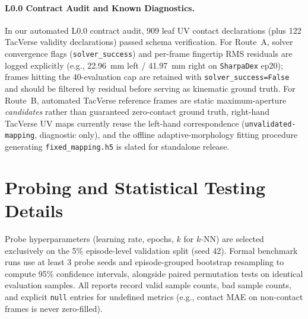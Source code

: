 \paragraph{L0.0 Contract Audit and Known Diagnostics.}
In our automated L0.0 contract audit, 909 leaf UV contact declarations (plus 122 TacVerse validity declarations) passed schema verification.
For Route~A, solver convergence flags (\texttt{solver\_success}) and per-frame fingertip RMS residuals are logged explicitly (e.g., 22.96~mm left / 41.97~mm right on \texttt{SharpaDex} ep20); frames hitting the 40-evaluation cap are retained with \texttt{solver\_success=False} and should be filtered by residual before serving as kinematic ground truth.
For Route~B, automated TacVerse reference frames are static maximum-aperture \emph{candidates} rather than guaranteed zero-contact ground truth, right-hand TacVerse UV maps currently reuse the left-hand correspondence (\texttt{unvalidated-mapping}, diagnostic only), and the offline adaptive-morphology fitting procedure generating \texttt{fixed\_mapping.h5} is slated for standalone release.

\section{Probing and Statistical Testing Details}
\label{app:probes}
Probe hyperparameters (learning rate, epochs, $k$ for $k$-NN) are selected exclusively on the 5\% episode-level validation split (seed 42).
Formal benchmark runs use at least 3 probe seeds and episode-grouped bootstrap resampling to compute 95\% confidence intervals, alongside paired permutation tests on identical evaluation samples.
All reports record valid sample counts, bad sample counts, and explicit \texttt{null} entries for undefined metrics (e.g., contact MAE on non-contact frames is never zero-filled).
